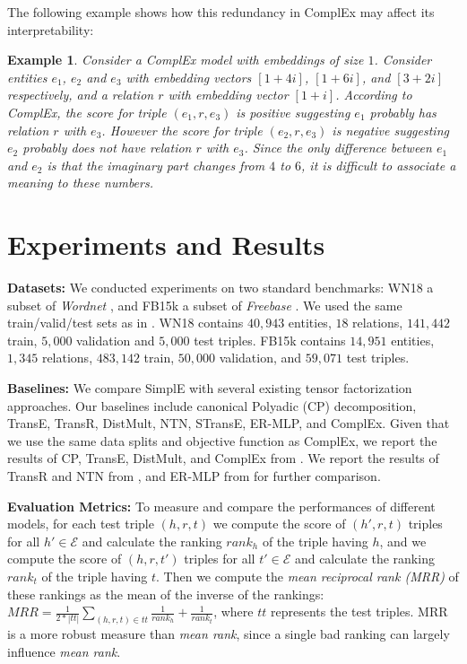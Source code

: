 \documentclass{article}
\newcommand{\entities}{\ensuremath{\mathcal{E}}}
\newcommand{\triple}[3]{(\mathit{#1}, \mathit{#2}, \mathit{#3})}
\newtheorem{exampl}{Example}
\newenvironment{example}{\begin{exampl}\em}{\end{exampl}}
\begin{document}
The following example shows how this redundancy in ComplEx may affect its interpretability:
\begin{example}
Consider a ComplEx model with embeddings of size $1$. Consider entities $e_1$, $e_2$ and $e_3$ with embedding vectors $[1 + 4i]$, $[1+6i]$, and $[3+2i]$ respectively, and a relation $r$ with embedding vector $[1+i]$.
According to ComplEx, the score for triple $\triple{e_1}{r}{e_3}$ is positive suggesting $e_1$ probably has relation $r$ with $e_3$. However the score for triple $\triple{e_2}{r}{e_3}$ is negative suggesting $e_2$ probably does not have relation $r$ with $e_3$. Since the only difference between $e_1$ and $e_2$ is that the imaginary part changes from $4$ to $6$, it is difficult to associate a meaning to these numbers.
\end{example}

\section{Experiments and Results}
\textbf{Datasets:} We conducted experiments on two standard benchmarks: WN18 a subset of \emph{Wordnet} \cite{miller1995wordnet}, and FB15k a subset of \emph{Freebase} \cite{bollacker2008freebase}. We used the same train/valid/test sets as in \cite{bordes2013translating}. WN18 contains $40,943$ entities, $18$ relations, $141,442$ train, $5,000$ validation and $5,000$ test triples. FB15k contains $14,951$ entities, $1,345$ relations, $483,142$ train, $50,000$ validation, and $59,071$ test triples.

\textbf{Baselines:} We compare SimplE with several existing tensor factorization approaches. Our baselines include canonical Polyadic (CP) decomposition, TransE, TransR,  DistMult, NTN, STransE, ER-MLP, and ComplEx. Given that we use the same data splits and objective function as ComplEx, we report the results of CP, TransE, DistMult, and ComplEx from \cite{trouillon2016complex}. We report the results of TransR and NTN from \cite{nguyen2017overview}, and ER-MLP from \cite{nickel2016holographic} for further comparison.

\textbf{Evaluation Metrics:} To measure and compare the performances of different models, for each test triple $\triple{h}{r}{t}$ we compute the score of $\triple{h'}{r}{t}$ triples for all $h' \in \entities$ and calculate the ranking $rank_h$ of the triple having $h$, and we compute the score of $\triple{h}{r}{t'}$ triples for all $t' \in \entities$ and calculate the ranking $rank_t$ of the triple having $t$. Then we compute the \emph{mean reciprocal rank (MRR)} of these rankings as the mean of the inverse of the rankings:
$MRR = \frac{1}{2*|tt|} \sum_{\triple{h}{r}{t} \in tt} \frac{1}{rank_h} + \frac{1}{rank_t}$,
where $tt$ represents the test triples. MRR is a more robust measure than \emph{mean rank}, since a single bad ranking can largely influence \emph{mean rank}.
\end{document}
